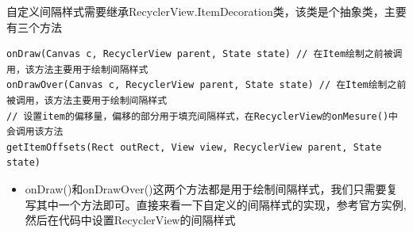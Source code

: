\documentclass[9pt, b5paper]{article}
\begin{document}
自定义间隔样式需要继承RecyclerView.ItemDecoration类，该类是个抽象类，主要有三个方法
\begin{verbatim}
onDraw(Canvas c, RecyclerView parent, State state) // 在Item绘制之前被调用，该方法主要用于绘制间隔样式
onDrawOver(Canvas c, RecyclerView parent, State state) // 在Item绘制之前被调用，该方法主要用于绘制间隔样式
// 设置item的偏移量，偏移的部分用于填充间隔样式，在RecyclerView的onMesure()中会调用该方法
getItemOffsets(Rect outRect, View view, RecyclerView parent, State state)
\end{verbatim}
\begin{itemize}
\item onDraw()和onDrawOver()这两个方法都是用于绘制间隔样式，我们只需要复写其中一个方法即可。直接来看一下自定义的间隔样式的实现，参考官方实例, 然后在代码中设置RecyclerView的间隔样式
\end{itemize}
\end{document}
